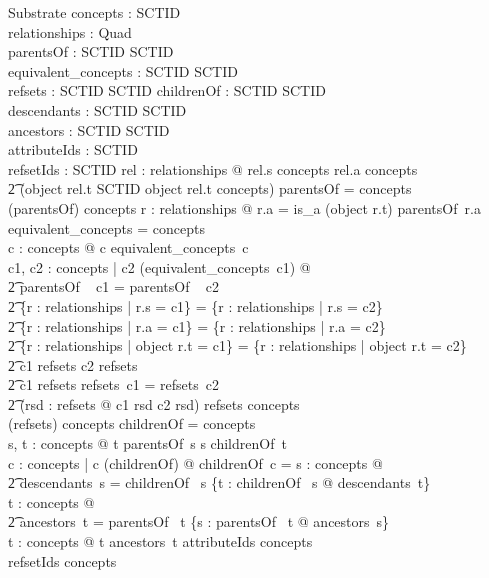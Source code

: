 \documentclass{article}
\begin{document}
\begin{schema}{Substrate}
   concepts : \power SCTID \\
   relationships : \power Quad  \\
   parentsOf : SCTID \pfun \power SCTID \\
   equivalent\_concepts : SCTID \pfun \power SCTID \\
   refsets : SCTID \pfun \power SCTID
\also
   childrenOf : SCTID \pfun \power SCTID \\
   descendants : SCTID \pfun \power SCTID \\
   ancestors : SCTID \pfun \power SCTID \\
   attributeIds : \power SCTID \\
   refsetIds : \power SCTID
\where
   \forall rel : relationships @  rel.s \in concepts \land rel.a \in concepts \land \\
\t2 (object \inv rel.t \in SCTID \implies object \inv rel.t \in concepts)
\also
   \dom parentsOf = concepts \\
   \bigcup (\ran parentsOf) \subseteq concepts
\also
   \forall r : relationships @ r.a = is\_a \implies (object \inv r.t) \in parentsOf~r.a
\also
   \dom equivalent\_concepts = concepts \\
  \forall c : concepts @ c \in equivalent\_concepts~c \\
  \forall c1, c2 : concepts | c2 \in (equivalent\_concepts~c1) @ \\
\t2 parentsOf ~ c1 = parentsOf ~ c2 \land \\
\t2 \{r : relationships | r.s = c1\} = \{r : relationships | r.s = c2\} \land \\
\t2 \{r : relationships | r.a = c1\} = \{r : relationships | r.a = c2\} \land \\
\t2 \{r : relationships | object \inv r.t = c1\} = \{r : relationships | object \inv r.t = c2\} \land \\
\t2 c1 \in \dom refsets \iff c2 \in \dom refsets \land \\
\t2 c1 \in \dom refsets \implies refsets~c1 = refsets~c2 \land \\
\t2 (\forall rsd : \ran refsets @ c1 \in rsd \iff c2 \in rsd)
\also
   \dom refsets \subseteq concepts \\
   \bigcup (\ran refsets) \subseteq concepts
\also
    \dom childrenOf = concepts \\
    \forall s, t : concepts @ t \in parentsOf~s \iff s \in childrenOf~t  \\
    \forall c : concepts | c \notin \bigcup (\ran childrenOf) @ childrenOf~c = \emptyset 
\also
   \forall s : concepts @ \\
\t2 descendants~s = childrenOf~ s \cup \bigcup \{t : childrenOf~ s @ descendants~t\} \\
   \forall t : concepts @ \\
\t2 ancestors~t = parentsOf~ t \cup \bigcup \{s : parentsOf~ t @ ancestors~s\} \\
   \forall t : concepts @ t \notin ancestors~t
\also
   attributeIds \subseteq concepts \\
   refsetIds \subseteq concepts
\end{schema}
\end{document}
